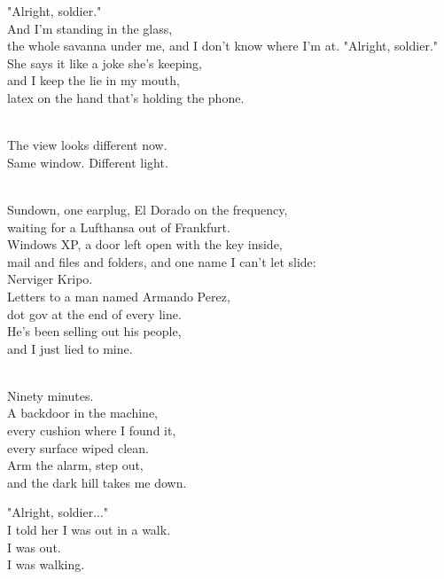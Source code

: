 \begin{lyrics}
"Alright, soldier."
\\
And I'm standing in the glass,\\
the whole savanna under me, and I don't know where I'm at.
"Alright, soldier."
\\
She says it like a joke she's keeping,\\
and I keep the lie in my mouth,\\
latex on the hand that's holding the phone.

\\
The view looks different now.\\
Same window. Different light.

\\
Sundown, one earplug, El Dorado on the frequency,\\
waiting for a Lufthansa out of Frankfurt.\\
Windows XP, a door left open with the key inside,\\
mail and files and folders, and one name I can't let slide:\\
Nerviger Kripo.\\
Letters to a man named Armando Perez,\\
dot gov at the end of every line.\\
He's been selling out his people,\\
and I just lied to mine.

\\
Ninety minutes.\\
A backdoor in the machine,\\
every cushion where I found it,\\
every surface wiped clean.\\
Arm the alarm, step out,\\
and the dark hill takes me down.

"Alright, soldier..."
\\
I told her I was out in a walk.\\
I was out.\\
I was walking.
\end{lyrics}

